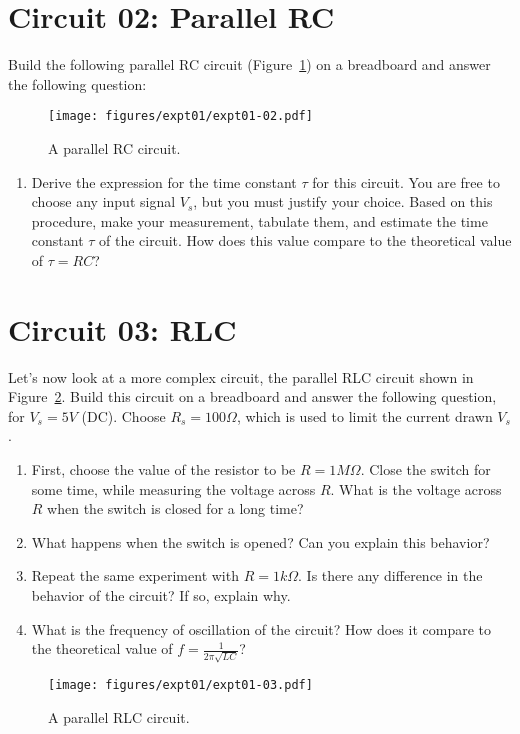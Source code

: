 \section{Circuit 02: Parallel RC}
Build the following parallel RC circuit (Figure~\ref{fig:expt01-02}) on a breadboard and answer the following question:
\begin{figure}[htbp]
    \centering
    \texttt{[image: figures/expt01/expt01-02.pdf]}
    \caption{A parallel RC circuit.}
    \label{fig:expt01-02}
\end{figure}
\begin{enumerate}
    \item Derive the expression for the time constant $\tau$ for this circuit. You are free to choose any input signal $V_s$, but you must justify your choice. Based on this procedure, make your measurement, tabulate them, and estimate the time constant $\tau$ of the circuit. How does this value compare to the theoretical value of $\tau = RC$?
\end{enumerate}

\section{Circuit 03: RLC}
Let's now look at a more complex circuit, the parallel RLC circuit shown in Figure~\ref{fig:expt01-03}. Build this circuit on a breadboard and answer the following question, for $V_s = 5V$ (DC). Choose $R_s = 100\Omega$, which is used to limit the current drawn $V_s$.
\begin{enumerate}
    \item First, choose the value of the resistor to be $R = 1M\Omega$. Close the switch for some time, while measuring the voltage across $R$. What is the voltage across $R$ when the switch is closed for a long time?
    \item What happens when the switch is opened? Can you explain this behavior?
    \item Repeat the same experiment with $R=1k\Omega$. Is there any difference in the behavior of the circuit? If so, explain why.
    \item What is the frequency of oscillation of the circuit? How does it compare to the theoretical value of $f = \frac{1}{2\pi\sqrt{LC}}$?
\end{enumerate}
\begin{figure}[htbp]
    \centering
    \texttt{[image: figures/expt01/expt01-03.pdf]}
    \caption{A parallel RLC circuit.}
    \label{fig:expt01-03}
\end{figure}


